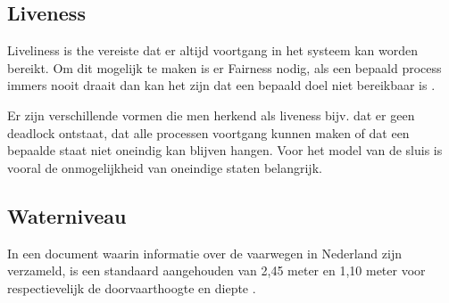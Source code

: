 \subsection{Liveness} \label{liveness}
Liveliness is the vereiste dat er altijd voortgang in het systeem kan worden bereikt. Om dit mogelijk te maken is er Fairness nodig, als een bepaald process immers nooit draait dan kan het zijn dat een bepaald doel niet bereikbaar is \cite{fairnessandliveness}.

Er zijn verschillende vormen die men herkend als liveness bijv. dat er geen deadlock ontstaat, dat alle processen voortgang kunnen maken of dat een bepaalde staat niet oneindig kan blijven hangen. Voor het model van de sluis is vooral de onmogelijkheid van oneindige staten belangrijk.

\subsection{Waterniveau}

In een document waarin informatie over de vaarwegen in Nederland zijn verzameld, is een standaard aangehouden van 2,45 meter en 1,10 meter voor respectievelijk de doorvaarthoogte en diepte \cite{vaarwegennederland2017}. 